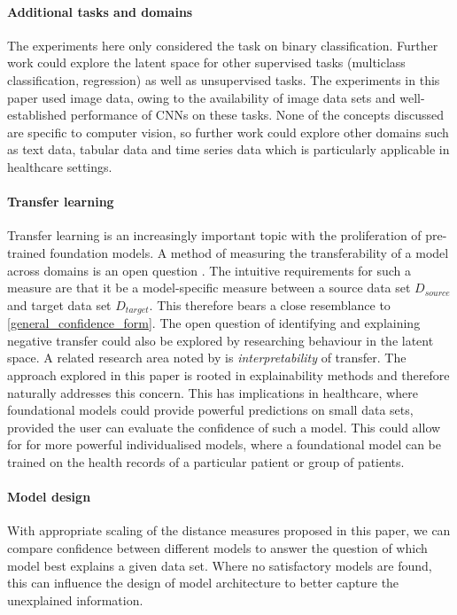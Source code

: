 \documentclass{article}
\begin{document}
\paragraph{Additional tasks and domains}
The experiments here only considered the task on binary classification. Further work could explore the latent space for other supervised tasks (multiclass classification, regression) as well as unsupervised tasks.
The experiments in this paper used image data, owing to the availability of image data sets and well-established performance of CNNs on these tasks. None of the concepts discussed are specific to computer vision, so further work could explore other domains such as text data, tabular data and time series data which is particularly applicable in healthcare settings.

\paragraph{Transfer learning} \label{sec:transfer learning}
Transfer learning is an increasingly important topic with the proliferation of pre-trained foundation models. A method of measuring the transferability of a model across domains is an open question \cite{pan_survey_2010} \cite{zhuang_comprehensive_2021}. The intuitive requirements for such a measure are that it be a model-specific measure between  a source data set $D_{source}$ and target data set $D_{target}$. This therefore bears a close resemblance to \ref{general_confidence_form}.
The open question of identifying and explaining negative transfer could also be explored by researching behaviour in the latent space.
A related research area noted by \cite{zhuang_comprehensive_2021} is \emph{interpretability} of transfer. The approach explored in this paper is rooted in explainability methods and therefore naturally addresses this concern.
This has implications in healthcare, where foundational models could provide powerful predictions on small data sets, provided the user can evaluate the confidence of such a model. This could allow for for more powerful individualised models, where a foundational model can be trained on the health records of a particular patient or group of patients.


\paragraph{Model design}
With appropriate scaling of the distance measures proposed in this paper, we can compare confidence between different models to answer the question of which model best explains a given data set. Where no satisfactory models are found, this can influence the design of model architecture to better capture the unexplained information.
\end{document}
